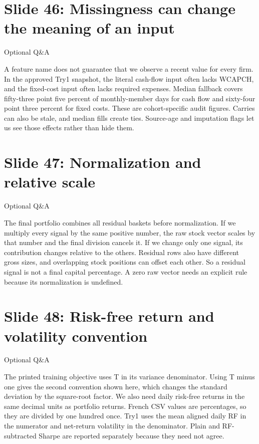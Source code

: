 \documentclass[11pt]{article}
\begin{document}
\section*{Slide 46: Missingness can change the meaning of an input}

\textcolor{SBred}{Optional Q\&A}

A feature name does not guarantee that we observe a recent value for every firm. In the approved Try1 snapshot, the literal cash-flow input often lacks WCAPCH, and the fixed-cost input often lacks required expenses. Median fallback covers fifty-three point five percent of monthly-member days for cash flow and sixty-four point three percent for fixed costs. These are cohort-specific audit figures. Carries can also be stale, and median fills create ties. Source-age and imputation flags let us see those effects rather than hide them.

\section*{Slide 47: Normalization and relative scale}

\textcolor{SBred}{Optional Q\&A}

The final portfolio combines all residual baskets before normalization. If we multiply every signal by the same positive number, the raw stock vector scales by that number and the final division cancels it. If we change only one signal, its contribution changes relative to the others. Residual rows also have different gross sizes, and overlapping stock positions can offset each other. So a residual signal is not a final capital percentage. A zero raw vector needs an explicit rule because its normalization is undefined.

\section*{Slide 48: Risk-free return and volatility convention}

\textcolor{SBred}{Optional Q\&A}

The printed training objective uses T in its variance denominator. Using T minus one gives the second convention shown here, which changes the standard deviation by the square-root factor. We also need daily risk-free returns in the same decimal units as portfolio returns. French CSV values are percentages, so they are divided by one hundred once. Try1 uses the mean aligned daily RF in the numerator and net-return volatility in the denominator. Plain and RF-subtracted Sharpe are reported separately because they need not agree.
\end{document}
